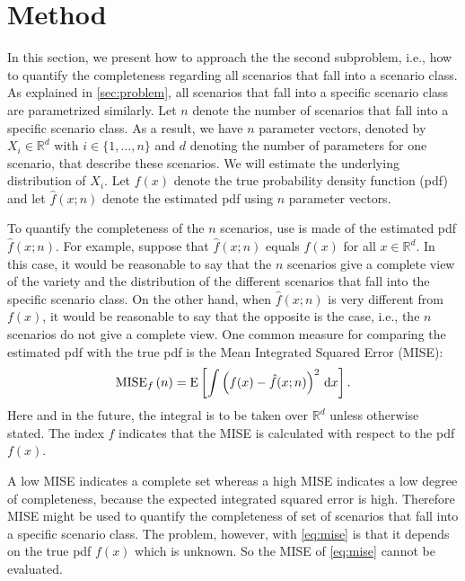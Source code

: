 \section{Method}
\label{sec:method}

In this section, we present how to approach the the second subproblem, i.e., how to quantify the completeness regarding all scenarios that fall into a scenario class. As explained in \cref{sec:problem}, all scenarios that fall into a specific scenario class are parametrized similarly. Let $n$ denote the number of scenarios that fall into a specific scenario class. As a result, we have $n$ parameter vectors, denoted by $X_i \in \mathbb{R}^d$ with $i\in \{1,\ldots,n\}$ and $d$ denoting the number of parameters for one scenario, that describe these scenarios. We will estimate the underlying distribution of $X_i$. Let $f(x)$ denote the true probability density function (pdf) and let $\hat{f}(x;n)$ denote the estimated pdf using $n$ parameter vectors.

To quantify the completeness of the $n$ scenarios, use is made of the estimated pdf $\hat{f}(x;n)$. For example, suppose that $\hat{f}(x;n)$ equals $f(x)$ for all $x \in \mathbb{R}^d$. In this case, it would be reasonable to say that the $n$ scenarios give a complete view of the variety and the distribution of the different scenarios that fall into the specific scenario class. On the other hand, when $\hat{f}(x;n)$ is very different from $f(x)$, it would be reasonable to say that the opposite is the case, i.e., the $n$ scenarios do not give a complete view. One common measure for comparing the estimated pdf with the true pdf is the Mean Integrated Squared Error (MISE):
\begin{equation}
	\label{eq:mise}
	\textup{MISE}_{f}\left( n \right) = \textup{E} \left[ \int \left( f(x) - \hat{f}(x;n) \right)^2 \mathrm{\,d} x \right].
\end{equation}
Here and in the future, the integral is to be taken over $\mathbb{R}^d$ unless otherwise stated. The index $f$ indicates that the MISE is calculated with respect to the pdf $f(x)$.

A low MISE indicates a complete set whereas a high MISE indicates a low degree of completeness, because the expected integrated squared error is high. Therefore MISE might be used to quantify the completeness of set of scenarios that fall into a specific scenario class. The problem, however, with \cref{eq:mise} is that it depends on the true pdf $f(x)$ which is unknown. So the MISE of \cref{eq:mise} cannot be evaluated.

